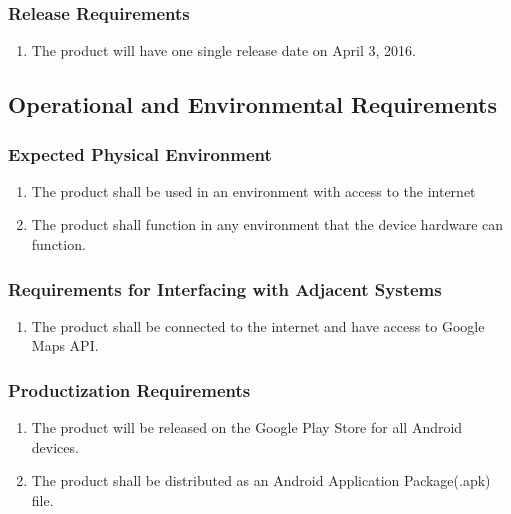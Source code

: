 \documentclass[]{article}
\begin{document}
\subsubsection{Release Requirements}
\label{ssub:release_requirements}
\begin{enumerate}[{OE}1. ]
	\item The product will have one single release date on April 3, 2016.
\end{enumerate}


\subsection{Operational and Environmental Requirements}
\label{sub:operational_and_environmental_requirements}

\subsubsection{Expected Physical Environment}
\label{ssub:expected_physical_environment}
\begin{enumerate}[{OE}1. ]
	\item The product shall be used in an environment with access to the internet
	\item The product shall function in any environment that the device hardware can function.
\end{enumerate}

\subsubsection{Requirements for Interfacing with Adjacent Systems}
\label{ssub:requirements_for_interfacing_with_adjacent_systems}
\begin{enumerate}[{SR}1. ]
	\item The product shall be connected to the internet and have access to Google Maps API.
\end{enumerate}

\subsubsection{Productization Requirements}
\label{ssub:productization_requirements}
\begin{enumerate}[{OE}1. ]
	\item The product will be released on the Google Play Store for all Android devices.
	\item The product shall be distributed as an Android Application Package(.apk) file.
\end{enumerate}
\end{document}
